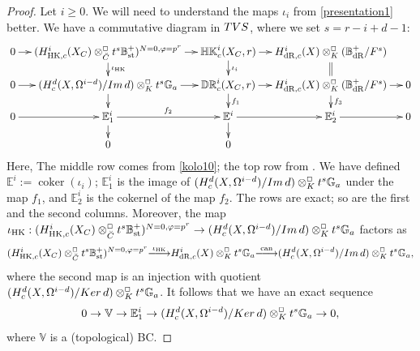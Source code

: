 \documentclass[10pt,reqno]{amsart}
\theoremstyle{definition}
\theoremstyle{remark}
\def\lomapr#1{\smash{\mathop{\relbar\joinrel\longrightarrow}\limits^{#1}}}
\def\phi{\varphi}
\newcommand{\dr}{\operatorname{dR} }
\newcommand{\can}{ \operatorname{can} }
\newcommand{\st}{\operatorname{st} }
\newcommand{\coker}{\operatorname{coker} }
\newcommand{\hk}{\operatorname{HK} }
\numberwithin{equation}{section}
\numberwithin{equation}{section}
\begin{document}
\begin{proof}
     Let $i\geq 0$. We will need to understand the maps $\iota_{i}$ from \eqref{presentation1} better. We have a commutative diagram in ${\rm TVS}$, where we set $s=r-i+d-1$: 
  \begin{equation}\label{air1}
  \xymatrix@C=4mm@R=4mm{
        0\ar[r] & (H^i_{\hk,c}(X_C)\otimes^{{\Box}}_{\breve{C}}t^{s}\mathbb{B}^+_{\st})^{N=0,\phi=p^r}\ar[d]^{\iota_{\hk}} \ar[r] &   \mathbb{HK}^i_c(X_C,r)\ar[d]^{\iota_i}\ar[r]  & H^i_{\dr,c}(X)\otimes^{{\Box}}_{K}(\mathbb{B}^+_{\dr}/F^{s})\ar@{=}[d] \\
     0\ar[r] & (H^d_c(X,\Omega^{i-d})/{\rm Im}\,d)\otimes^{{\Box}}_{K}t^{s}\mathbb{G}_a \ar[d] \ar[r] & \mathbb{DR}^i_c(X_C,r)\ar[r] \ar[d]^{f_1} & H^i_{\dr,c}(X)\otimes^{{\Box}}_{K}(\mathbb{B}^+_{\dr}/F^{s})\ar[r] \ar[d]^{f_3} &0\\
         0\ar[r] &  \mathbb{E}^i_1\ar[r]^{f_2}\ar[d]  &  \mathbb{E}^i\ar[r] \ar[d] & \mathbb{E}^i_2\ar[r]  &0\\
         &  0 & 0
         }
  \end{equation}
 Here, The middle row comes  from \eqref{kolo10}; the top row from \cite[Lemma 8.1]{AGN}.  
We have defined  ${\mathbb E}^i:=\coker(\iota_i)$;
$ \mathbb{E}^i_1$  is the image of $(H^d_c(X,\Omega^{i-d})/{\rm Im}\,d)\otimes^{\Box}_{K}t^{s}\mathbb{G}_a$ under the map $f_1$,
  and $\mathbb{E}^i_2$ is the cokernel of the map $f_2$. The rows are exact;  so are the first and the second columns.      Moreover,  the map $\iota_{\hk}:  (H^i_{\hk,c}(X_C)\otimes^{{\Box}}_{\breve{C}}t^{s}\mathbb{B}^+_{\st})^{N=0,\phi=p^r}\to (H^d_c(X,\Omega^{i-d})/{\rm Im}\,d)\otimes^{{\Box}}_{K}t^s\mathbb{G}_a$ factors as 
  \begin{equation}\label{wreszcie0}
 (H^i_{\hk,c}(X_C)\otimes^{{\Box}}_{\breve{C}}t^{s}\mathbb{B}^+_{\st})^{N=0,\phi=p^r}\lomapr{\iota_{\hk}} 
H^i_{\dr,c}(X)\otimes^{{\Box}}_{K}t^s\mathbb{G}_a\lomapr{\can} (H^d_c(X,\Omega^{i-d})/{\rm Im}\,d)\otimes^{{\Box}}_{K}t^s\mathbb{G}_a,
  \end{equation}
  where the second map is an injection with quotient $(H^d_c(X,\Omega^{i-d})/{\rm Ker}\,d)\otimes^{{\Box}}_{K}t^s\mathbb{G}_a$.  It follows that we have an exact sequence
  \begin{equation}\label{wreszcie}
  0\to \mathbb{V}\to   \mathbb{E}^i_1 \to  (H^d_c(X,\Omega^{i-d})/{\rm Ker}\,d)\otimes^{\Box}_{K}t^s\mathbb{G}_a \to 0,
  \end{equation}
  where $\mathbb{V}$ is a (topological) BC. 
  


\end{proof}
\end{document}
